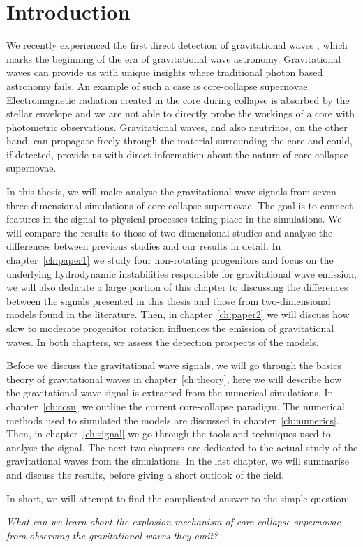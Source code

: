 \chapter{Introduction}
We recently experienced the first direct detection of gravitational waves \citep{gw_detect},
which marks the beginning of the era of gravitational wave astronomy. Gravitational waves can provide us with 
unique insights where traditional photon based astronomy fails. An example of such a case is
core-collapse supernovae. Electromagnetic radiation created in the core during collapse is absorbed by the stellar
envelope and we are not able to directly probe the workings of a core with 
photometric observations. Gravitational waves, and also neutrinos, on the other hand, can
propagate freely through the material surrounding the core and could, if detected, provide us with
direct information about the nature of core-collapse supernovae.

In this thesis, we will make analyse the gravitational wave signals
from seven three-dimensional simulations of core-collapse supernovae. 
The goal is to connect features in the signal
to physical processes taking place in the simulations. We will compare the results to
those of two-dimensional studies and analyse the differences between previous studies and our results in detail.
In chapter~\ref{ch:paper1} we study four non-rotating progenitors and focus on the
underlying hydrodynamic instabilities responsible for gravitational wave emission,
we will also dedicate a large portion of this chapter to discussing the differences between
the signals presented in this thesis and those from two-dimensional models found in the literature.
Then, in chapter~\ref{ch:paper2} we will discuss how slow to moderate progenitor rotation influences the emission of
gravitational waves. In both chapters, we assess the detection prospects of the models.

Before we discuss the gravitational wave signals, we will go through the basics theory of gravitational waves in
chapter~\ref{ch:theory}, here we will describe how the gravitational wave signal is extracted from the numerical simulations. 
In chapter~\ref{ch:ccsn} we outline the current core-collapse paradigm. The numerical
methods used to simulated the models are discussed in chapter~\ref{ch:numerics}. Then, in chapter~\ref{ch:signal}
we go through the tools and techniques used to analyse the signal. The next two chapters are dedicated to
the actual study of the gravitational waves from the simulations. In the last chapter, we will summarise and discuss
the results, before giving a short outlook of the field.

In short, we will attempt to find the 
complicated answer to the simple question:
\begin{displayquote}
\textit{What can we learn about the explosion mechanism of core-collapse supernovae
from observing the gravitational waves they emit?}
\end{displayquote}
